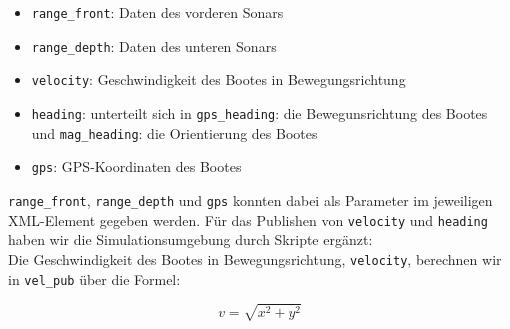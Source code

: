 \documentclass[11pt]{article}
\begin{document}
\begin{itemize}
	\item \texttt{range\_front}: Daten des vorderen Sonars
	\item \texttt{range\_depth}: Daten des unteren Sonars
	\item \texttt{velocity}: Geschwindigkeit des Bootes in Bewegungsrichtung
	\item \texttt{heading}: unterteilt sich in \texttt{gps\_heading}: die Bewegunsrichtung des Bootes und \texttt{mag\_heading}: die Orientierung des Bootes
	\item \texttt{gps}: GPS-Koordinaten des Bootes
\end{itemize}
\texttt{range\_front}, \texttt{range\_depth} und \texttt{gps} konnten dabei als Parameter im jeweiligen XML-Element gegeben werden. Für das Publishen von \texttt{velocity} und \texttt{heading} haben wir die Simulationsumgebung durch Skripte ergänzt:\\
Die Geschwindigkeit des Bootes in Bewegungsrichtung, \texttt{velocity}, berechnen wir in \texttt{vel\_pub} über die Formel:

\begin{equation}
v = \sqrt{x^2+y^2}
\end{equation}
\end{document}
